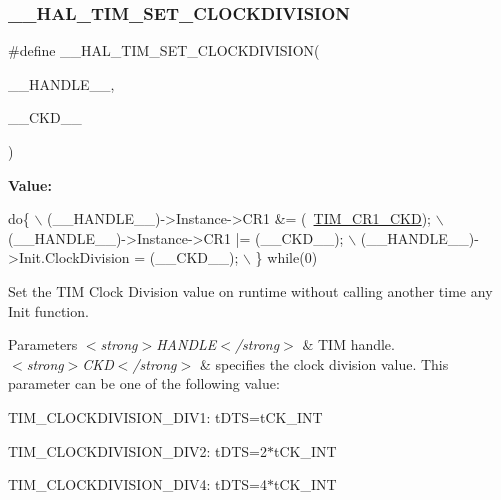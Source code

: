 \subsubsection{\texorpdfstring{\+\_\+\+\_\+\+H\+A\+L\+\_\+\+T\+I\+M\+\_\+\+S\+E\+T\+\_\+\+C\+L\+O\+C\+K\+D\+I\+V\+I\+S\+I\+ON}{\_\_HAL\_TIM\_SET\_CLOCKDIVISION}}
{\footnotesize\ttfamily \#define \+\_\+\+\_\+\+H\+A\+L\+\_\+\+T\+I\+M\+\_\+\+S\+E\+T\+\_\+\+C\+L\+O\+C\+K\+D\+I\+V\+I\+S\+I\+ON(\begin{DoxyParamCaption}\item[{}]{\+\_\+\+\_\+\+H\+A\+N\+D\+L\+E\+\_\+\+\_\+,  }\item[{}]{\+\_\+\+\_\+\+C\+K\+D\+\_\+\+\_\+ }\end{DoxyParamCaption})}

{\bfseries Value\+:}
\begin{DoxyCode}
\textcolor{keywordflow}{do}\{                                                   \(\backslash\)
                              (\_\_HANDLE\_\_)->Instance->CR1 &= (~\hyperlink{group___peripheral___registers___bits___definition_gacacc4ff7e5b75fd2e4e6b672ccd33a72}{TIM\_CR1\_CKD});  \(\backslash\)
                              (\_\_HANDLE\_\_)->Instance->CR1 |= (\_\_CKD\_\_);       \(\backslash\)
                              (\_\_HANDLE\_\_)->Init.ClockDivision = (\_\_CKD\_\_);   \(\backslash\)
                          \} \textcolor{keywordflow}{while}(0)
\end{DoxyCode}


Set the T\+IM Clock Division value on runtime without calling another time any Init function. 


\begin{DoxyParams}{Parameters}
{\em $<$strong$>$\+H\+A\+N\+D\+L\+E$<$/strong$>$} & T\+IM handle. \\
\hline
{\em $<$strong$>$\+C\+K\+D$<$/strong$>$} & specifies the clock division value. This parameter can be one of the following value\+: \begin{DoxyItemize}
\item T\+I\+M\+\_\+\+C\+L\+O\+C\+K\+D\+I\+V\+I\+S\+I\+O\+N\+\_\+\+D\+I\+V1\+: t\+D\+TS=t\+C\+K\+\_\+\+I\+NT \item T\+I\+M\+\_\+\+C\+L\+O\+C\+K\+D\+I\+V\+I\+S\+I\+O\+N\+\_\+\+D\+I\+V2\+: t\+D\+TS=2$\ast$t\+C\+K\+\_\+\+I\+NT \item T\+I\+M\+\_\+\+C\+L\+O\+C\+K\+D\+I\+V\+I\+S\+I\+O\+N\+\_\+\+D\+I\+V4\+: t\+D\+TS=4$\ast$t\+C\+K\+\_\+\+I\+NT \end{DoxyItemize}
\\
\hline
\end{DoxyParams}


